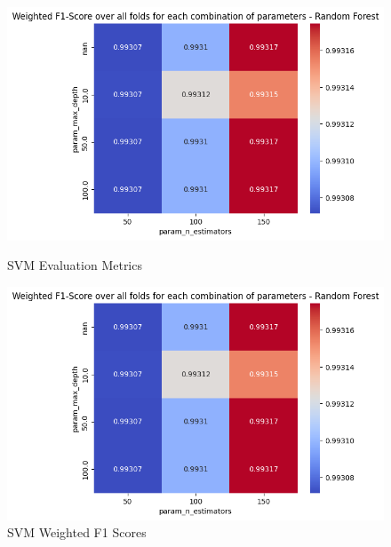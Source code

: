 \begin{figure}[H]
            \begin{minipage}{\textwidth}
                \begin{minipage}[t]{0.48\textwidth}
                    \centering
                    \includegraphics[width=\textwidth]{../figures/plots/section2/weighted_f1_score_for_each_combination_of_parameters_random_forest.png}
                    \caption{SVM Evaluation Metrics}
                    \label{fig:}
                \end{minipage}%
                \hfill%
                \begin{minipage}[t]{0.48\textwidth}
                    \centering
                    \includegraphics[width=\textwidth]{../figures/plots/section2/weighted_f1_score_for_each_combination_of_parameters_random_forest.png}
                    \caption{SVM Weighted F1 Scores}
                    \label{fig:}
                \end{minipage}
            \end{minipage}
            

\end{figure}
